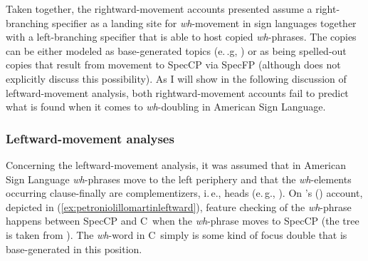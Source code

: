 Taken together, the rightward-movement accounts presented assume a right-branching specifier as a landing site for \textit{wh}-movement in sign languages together with a left-branching specifier that is able to host copied \textit{wh}-phrases. The copies can be either modeled as base-generated topics (e.\,.g, \citealt{neidle1994architecture}) or as being spelled-out copies that result from movement to SpecCP via SpecFP \citep{neidle2002language} (although \citealt{neidle2002language} does not explicitly discuss this possibility). As I will show in the following discussion of leftward-movement analysis, both rightward-movement accounts fail to predict what is found when it comes to \textit{wh}-doubling in American Sign Language.

\subsubsection{Leftward-movement analyses}
\noindent Concerning the leftward-movement analysis, it was assumed that in American Sign Language \textit{wh}-phrases move to the left periphery and that the \textit{wh}-elements occurring clause-finally are complementizers, i.\,e., heads (e.\,g., \citealt{petronio1997}). On \citeauthor{petronio1997}'s (\citeyear{petronio1997}) account, depicted in (\ref{ex:petroniolillomartinleftward}), feature checking of the \textit{wh}-phrase happens between SpecCP and C\textdegree\ when the \textit{wh}-phrase moves to SpecCP (the tree is taken from \citealt[27]{petronio1997}). The \textit{wh}-word in C\textdegree\ simply is some kind of focus double that is base-generated in this position.

\begin{exe}
\ex\label{ex:petroniolillomartinleftward} 
\begin{adjustbox}{width=0.8\linewidth}
\end{adjustbox}
\end{exe}

